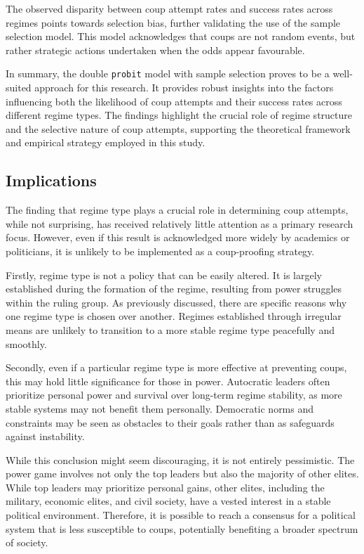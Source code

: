 \documentclass[
  12pt,
]{report}
\begin{document}
The observed disparity between coup attempt rates and success rates
across regimes points towards selection bias, further validating the use
of the sample selection model. This model acknowledges that coups are
not random events, but rather strategic actions undertaken when the odds
appear favourable.

In summary, the double \texttt{probit} model with sample selection
proves to be a well-suited approach for this research. It provides
robust insights into the factors influencing both the likelihood of coup
attempts and their success rates across different regime types. The
findings highlight the crucial role of regime structure and the
selective nature of coup attempts, supporting the theoretical framework
and empirical strategy employed in this study.

\subsection{Implications}\label{implications}

The finding that regime type plays a crucial role in determining coup
attempts, while not surprising, has received relatively little attention
as a primary research focus. However, even if this result is
acknowledged more widely by academics or politicians, it is unlikely to
be implemented as a coup-proofing strategy.

Firstly, regime type is not a policy that can be easily altered. It is
largely established during the formation of the regime, resulting from
power struggles within the ruling group. As previously discussed, there
are specific reasons why one regime type is chosen over another. Regimes
established through irregular means are unlikely to transition to a more
stable regime type peacefully and smoothly.

Secondly, even if a particular regime type is more effective at
preventing coups, this may hold little significance for those in power.
Autocratic leaders often prioritize personal power and survival over
long-term regime stability, as more stable systems may not benefit them
personally. Democratic norms and constraints may be seen as obstacles to
their goals rather than as safeguards against instability.

While this conclusion might seem discouraging, it is not entirely
pessimistic. The power game involves not only the top leaders but also
the majority of other elites. While top leaders may prioritize personal
gains, other elites, including the military, economic elites, and civil
society, have a vested interest in a stable political environment.
Therefore, it is possible to reach a consensus for a political system
that is less susceptible to coups, potentially benefiting a broader
spectrum of society.
\end{document}
